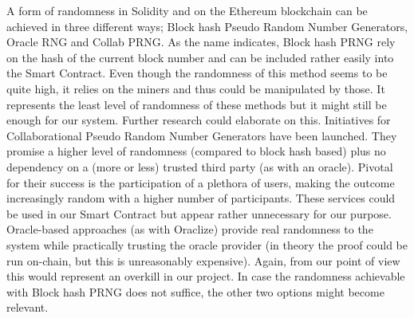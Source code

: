 A form of randomness in Solidity and on the Ethereum blockchain can be achieved in three different ways; Block hash Pseudo Random Number Generators, Oracle RNG and Collab PRNG.
As the name indicates, Block hash PRNG rely on the hash of the current block number and can be included rather easily into the Smart Contract. Even though the randomness of this method seems to be quite high, it relies on the miners and thus could be manipulated by those. It represents the least level of randomness of these methods but it might still be enough for our system. Further research could elaborate on this.
Initiatives for Collaborational Pseudo Random Number Generators have been launched. They promise a higher level of randomness (compared to block hash based) plus no dependency on a (more or less) trusted third party (as with an oracle). Pivotal for their success is the participation of a plethora of users, making the outcome increasingly random with a higher number of participants. These services could be used in our Smart Contract but appear rather unnecessary for our purpose.
Oracle-based approaches (as with Oraclize) provide real randomness to the system while practically trusting the oracle provider (in theory the proof could be run on-chain, but this is unreasonably expensive). Again, from our point of view this would represent an overkill in our project.
In case the randomness achievable with Block hash PRNG does not suffice, the other two options might become relevant.
